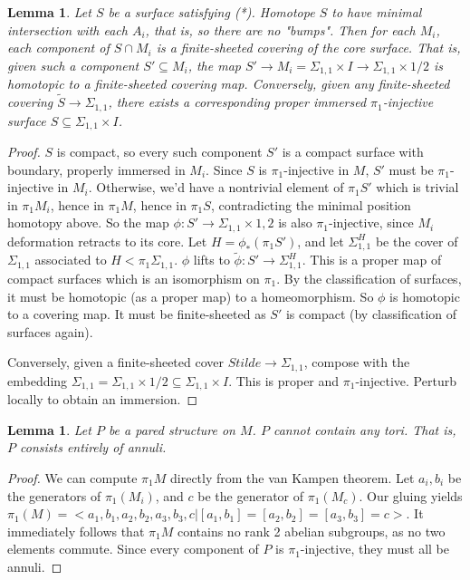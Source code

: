 \documentclass[12pt]{amsart}
\newtheorem{lemma}[theorem]{Lemma}
\theoremstyle{definition}
\newcommand{\x}{\times}
\newcommand{\Si}{\Sigma}
\newcommand{\cin}{\subseteq}
\begin{document}
\begin{lemma}

Let $S$ be a surface satisfying (*). Homotope $S$ to have minimal intersection
with each $A_i$, that is, so there are no "bumps".  Then for each $M_i$, each
component of $S \cap M_i$ is a finite-sheeted covering of the core surface.
That is, given such a component $S' \cin M_i$, the map $S' \to M_i
= \Si_{1,1}\x I \to \Si_{1,1}\x{1/2}$ is homotopic to a finite-sheeted covering
map. Conversely, given any finite-sheeted covering $\widetilde{S} \to
\Si_{1,1}$, there exists a corresponding proper immersed $\pi_1$-injective
surface $S \cin \Si_{1,1}\x I$.

\end{lemma}
\begin{proof}

$S$ is compact, so every such component $S'$ is a compact surface with
boundary, properly immersed in $M_i$. Since $S$ is $\pi_1$-injective in $M$,
$S'$ must be $\pi_1$-injective in $M_i$. Otherwise, we'd have a nontrivial
element of $\pi_1S'$ which is trivial in $\pi_1M_i$, hence in $\pi_1M$, hence
in $\pi_1S$, contradicting the minimal position homotopy above. So the map
$\phi : S'\to\Si_{1,1}\x{1,2}$ is also $\pi_1$-injective, since $M_i$
deformation retracts to its core. Let $H = \phi_*(\pi_1S')$, and let
$\Si_{1,1}^H$ be the cover of $\Si_{1,1}$ associated to $H<\pi_1\Si_{1,1}$.
$\phi$ lifts to $\widetilde{\phi}\colon S'\to \Si_{1,1}^H$. This is a proper
map of compact surfaces which is an isomorphism on $\pi_1$.  By the
classification of surfaces, it must be homotopic (as a proper map) to
a homeomorphism. So $\phi$ is homotopic to a covering map. It must be
finite-sheeted as $S'$ is compact (by classification of surfaces again).

Conversely, given a finite-sheeted cover $Stilde \to \Si_{1,1}$, compose with
the embedding $\Si_{1,1} = \Si_{1,1}\x{1/2} \cin \Si_{1,1}\x I$. This is proper
and $\pi_1$-injective.  Perturb locally to obtain an immersion.

\end{proof}

\begin{lemma}

Let $P$ be a pared structure on $M$. $P$ cannot contain any tori. That is,
$P$ consists entirely of annuli.

\end{lemma}
\begin{proof}

We can compute $\pi_1M$ directly from the van Kampen theorem. Let $a_i,b_i$ be
the generators of $\pi_1(M_i)$, and $c$ be the generator of $\pi_1(M_c)$. Our
gluing yields $\pi_1(M) = <a_1,b_1,a_2,b_2,a_3,b_3,c|
[a_1,b_1]=[a_2,b_2]=[a_3,b_3]=c>$. It immediately follows that $\pi_1M$
contains no rank 2 abelian subgroups, as no two elements commute. Since every
component of $P$ is $\pi_1$-injective, they must all be annuli.

\end{proof}
\end{document}
